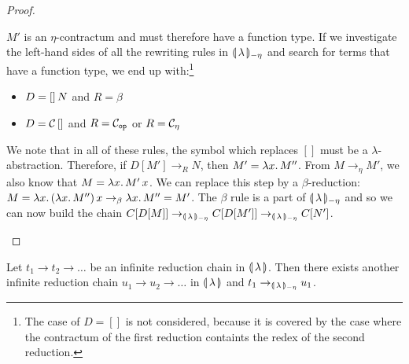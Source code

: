 \begin{proof}
\begin{itemize}
\begin{itemize}
      $M'$ is an $\eta$-contractum and must therefore have a function
      type. If we investigate the left-hand sides of all the rewriting
      rules in ${\llparenthesis \, \lambda \, \rrparenthesis_{-\eta}}$ and search for terms that have a function type,
      we end up with:\footnote{The case of $D = []$ is not considered,
        because it is covered by the case where the contractum of the first
        reduction containts the redex of the second reduction.}

      \begin{itemize}
      \item $D = []\,N$ and $R = \beta$
      \item $D = \mathcal{C}\,[]$ and $R = \mathcal{C}_{\mathtt{op}}$ or $R = \mathcal{C}_\eta$
      \end{itemize}
      
      We note that in all of these rules, the symbol which replaces $[]$
      must be a $\lambda$-abstraction. Therefore, if $D[M'] \to_R N$, then
      $M' = \lambda x.\, M''$. From $M \to_\eta M'$, we also know that
      $M = \lambda x.\, M'\,x$. We can replace this step by a
      $\beta$-reduction:
      $M = \lambda x.\, (\lambda x.\, M'')\,x \to_\beta \lambda x.\, M'' =
      M'$. The $\beta$ rule is a part of ${\llparenthesis \, \lambda \, \rrparenthesis_{-\eta}}$ and so we can now build
      the chain $C[D[M]] \to_{\llparenthesis \, \lambda \, \rrparenthesis_{-\eta}} C[D[M']] \to_{\llparenthesis \, \lambda \, \rrparenthesis_{-\eta}} C[N']$.
    \end{itemize}
  \end{itemize}
\end{proof}

\begin{lemma}\label{lem:pulling-links}
  
  Let $t_1 \to t_2 \to \ldots$ be an infinite reduction chain in
  ${\llparenthesis \, \lambda \, \rrparenthesis}$. Then there exists another infinite reduction chain
  $u_1 \to u_2 \to \ldots$ in ${\llparenthesis \, \lambda \, \rrparenthesis}$ and $t_1 \to_{\llparenthesis \, \lambda \, \rrparenthesis_{-\eta}} u_1$.
\end{lemma}

